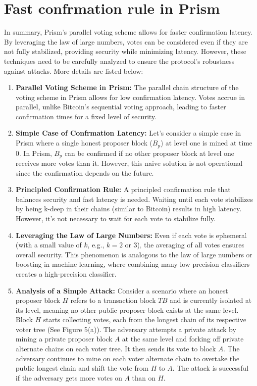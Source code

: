 \section{Fast confrmation rule in Prism}
In summary, Prism's parallel voting scheme allows for faster confirmation latency. By leveraging the law of large numbers, votes can be considered even if they are not fully stabilized, providing security while minimizing latency. However, these techniques need to be carefully analyzed to ensure the protocol's robustness against attacks. More details are listed below:
\begin{enumerate}
	\item \textbf{Parallel Voting Scheme in Prism:} The parallel chain structure of the voting scheme in Prism allows for low confirmation latency. Votes accrue in parallel, unlike Bitcoin's sequential voting approach, leading to faster confirmation times for a fixed level of security.
	\item \textbf{Simple Case of Confrmation Latency:} Let's consider a simple case in Prism where a single honest proposer block ($B_{p}$) at level one is mined at time $0$. In Prism, $B_{p}$ can be confirmed if no other proposer block at level one receives more votes than it. However, this naive solution is not operational since the confirmation depends on the future.
	\item \textbf{Principled Confirmation Rule:} A principled confirmation rule that balances security and fast latency is needed. Waiting until each vote stabilizes by being k-deep in their chains (similar to Bitcoin) results in high latency. However, it's not necessary to wait for each vote to stabilize fully.
	\item \textbf{Leveraging the Law of Large Numbers:} Even if each vote is ephemeral (with a small value of $k$, e.g., $k = 2$ or $3$), the averaging of all votes ensures overall security. This phenomenon is analogous to the law of large numbers or boosting in machine learning, where combining many low-precision classifiers creates a high-precision classifier.
	\item \textbf{Analysis of a Simple Attack:} Consider a scenario where an honest proposer block $H$ refers to a transaction block $TB$ and is currently isolated at its level, meaning no other public proposer block exists at the same level. Block $H$ starts collecting votes, each from the longest chain of its respective voter tree (See Figure 5(a)). The adversary attempts a private attack by mining a private proposer block $A$ at the same level and forking off private alternate chains on each voter tree. It then sends its vote to block $A$. The adversary continues to mine on each voter alternate chain to overtake the public longest chain and shift the vote from $H$ to $A$. The attack is successful if the adversary gets more votes on $A$ than on $H$.
\end{enumerate}
